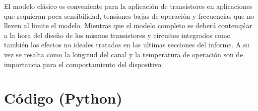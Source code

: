 \documentclass[a4paper]{article}
\begin{document}
El modelo clásico es conveniente para la aplicación de transistores en aplicaciones que requieran poca sensibilidad, tensiones bajas de operación y frecuencias que no lleven al limite el modelo. Mientras que el modelo completo se deberá contemplar a la hora del diseño de los mismos transistores y circuitos integrados como también los efectos no ideales tratados en las ultimas secciones del informe. A su vez se resalta como la longitud del canal y la temperatura de operación son de importancia para el comportamiento del dispositivo.


{\footnotesize
	\printbibliography
}
\newpage
\appendix
\section{Código (Python)}
\label{sec:apendice_codigo}
\end{document}
